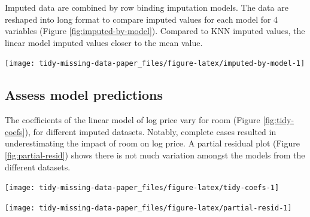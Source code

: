 \documentclass[]{article}
\let\origfigure\figure
\let\endorigfigure\endfigure
\renewenvironment{figure}[1][2] {
    \expandafter\origfigure\expandafter[H]
} {
    \endorigfigure
}
\theoremstyle{definition}
\theoremstyle{definition}
\theoremstyle{definition}
\theoremstyle{remark}
\begin{document}
Imputed data are combined by row binding imputation models. The data are
reshaped into long format to compare imputed values for each model for 4
variables (Figure \ref{fig:imputed-by-model}). Compared to KNN imputed
values, the linear model imputed values closer to the mean value.

\begin{figure}

{\centering \texttt{[image: tidy-missing-data-paper\_files/figure-latex/imputed-by-model-1]} 

}

\caption{Boxplots of complete case data, and data imputed with KNN or linear model for different variables. (A) number of bedrooms, (B) number of bathrooms, (C) number of carspots, and (D) landsize (on a log10 scale). KNN had similar results to complete case, and linear model had a lower median for cars and fewer extreme values for bedrooms.}\label{fig:imputed-by-model}
\end{figure}

\hypertarget{case-study-assess-model}{%
\subsection{Assess model predictions}\label{case-study-assess-model}}

The coefficients of the linear model of log price vary for room (Figure
\ref{fig:tidy-coefs}), for different imputed datasets. Notably, complete
cases resulted in underestimating the impact of room on log price. A
partial residual plot (Figure \ref{fig:partial-resid}) shows there is
not much variation amongst the models from the different datasets.

\begin{figure}

{\centering \texttt{[image: tidy-missing-data-paper\_files/figure-latex/tidy-coefs-1]} 

}

\caption{Visualization of the variation in coefficients for linear model of log price for each of the different datasets for the number of rooms. In red is complete case (cc), in green is the knn imputed dataset, and in blue the imputed by linear model. Using the complete case dataset produced smaller coefficients compared to the imputed models.}\label{fig:tidy-coefs}
\end{figure}

\begin{figure}

{\centering \texttt{[image: tidy-missing-data-paper\_files/figure-latex/partial-resid-1]} 

}

\caption{Partial residual plot for each data set, complete cases (cc), imputed with KNN (knn), and imputed with a linear model (lm). There is not much variation amongst the different datasets from the different imputation methods.}\label{fig:partial-resid}
\end{figure}
\end{document}
